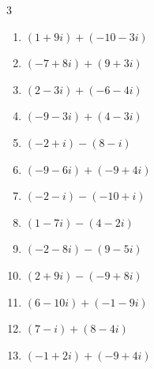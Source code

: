 \begin{multicols}{3}
\begin{enumerate}
        \phantom{$\displaystyle =5-8i$}

\columnbreak %

  \item $\displaystyle (1+9i) + (-10-3i)$

        \phantom{$\displaystyle =-9+6i$}

  \item $\displaystyle (-7+8i) + (9+3i)$

        \phantom{$\displaystyle =2+11i$}

  \item $\displaystyle (2-3i) + (-6-4i)$

        \phantom{$\displaystyle =-4-7i$}

  \item $\displaystyle (-9-3i) + (4-3i)$

        \phantom{$\displaystyle =-5-6i$}

  \item $\displaystyle (-2+i) - (8-i)$

        \phantom{$\displaystyle =-10+2i$}

  \item $\displaystyle (-9-6i) + (-9+4i)$

        \phantom{$\displaystyle =-18-2i$}

  \item $\displaystyle (-2-i) - (-10+i)$

        \phantom{$\displaystyle =8-2i$}

  \item $\displaystyle (1-7i) - (4-2i)$

        \phantom{$\displaystyle =-3-5i$}

  \item $\displaystyle (-2-8i) - (9-5i)$

        \phantom{$\displaystyle =-11-3i$}

  \item $\displaystyle (2+9i) - (-9+8i)$

        \phantom{$\displaystyle =11+i$}

  \item $\displaystyle (6-10i) + (-1-9i)$

        \phantom{$\displaystyle =5-19i$}

  \item $\displaystyle (7-i) + (8-4i)$

        \phantom{$\displaystyle =15-5i$}

  \item $\displaystyle (-1+2i) + (-9+4i)$


\end{enumerate}
\end{multicols}
